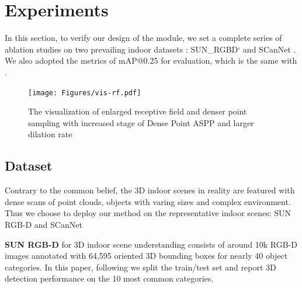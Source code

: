 \documentclass[runningheads]{llncs}
\begin{document}
\section{Experiments}
In this section, to verify our design of the module, we set a complete series of  ablation studies on two prevailing indoor datasets : SUN\_RGBD`\cite{SUN_RGBD} and SCanNet\cite{SCannet} . We also adopted the  metrics of mAP@0.25 for evaluation, which is the same with \cite{VoteNet,deepsliding} .     


\begin{figure}
			\begin{minipage}{1\textwidth}
				\centering
				\texttt{[image: Figures/vis-rf.pdf]}
			\end{minipage}
    \caption{The visualization of enlarged receptive field and denser point sampling with increased stage of Dense Point ASPP and larger dilation rate}
    \label{fig:vis-rf}
\end{figure}

\subsection{Dataset}
Contrary to the common belief, the 3D indoor scenes in reality are featured with dense scans of point clouds, objects with varing sizes and complex environment. Thus we choose to deploy our method on the representative indoor scenes: SUN RGB-D and SCanNet 

\textbf{SUN RGB-D} \cite{SUN_RGBD} for 3D indoor scene understanding consists of around 10k RGB-D images annotated with 64,595 oriented 3D bounding boxes for nearly 40 object categories. In this paper, following \cite{VoteNet} we split the train/test set and report 3D detection performance on the 10 most common categories. %
\end{document}
